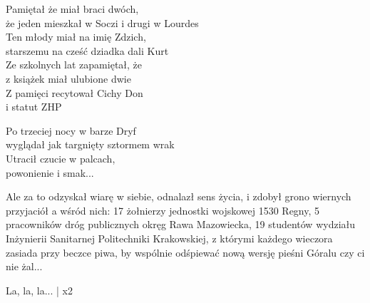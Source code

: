 \begin{text}
   Pamiętał że miał braci dwóch,\\
   że jeden mieszkał w Soczi i drugi w Lourdes\\
   Ten młody miał na imię Zdzich,\\
   starszemu na cześć dziadka dali Kurt\\
   Ze szkolnych lat zapamiętał, że\\
   z książek miał ulubione dwie\\
   Z pamięci recytował Cichy Don\\
   i statut ZHP
    
   Po trzeciej nocy w barze Dryf\\
   wyglądał jak targnięty sztormem wrak\\
   Utracił czucie w palcach,\\
   powonienie i smak...

   Ale za to odzyskał wiarę w siebie, odnalazł sens życia, i zdobył grono wiernych przyjaciół a wśród nich:
   17 żołnierzy jednostki wojskowej 1530 Regny, 5 pracowników dróg publicznych okręg Rawa Mazowiecka,
   19 studentów wydziału Inżynierii Sanitarnej Politechniki Krakowskiej,
   z którymi każdego wieczora zasiada przy beczce piwa,
   by wspólnie odśpiewać nową wersję pieśni Góralu czy ci nie żal...
 
   \vin La, la, la... | x2
\end{text}
